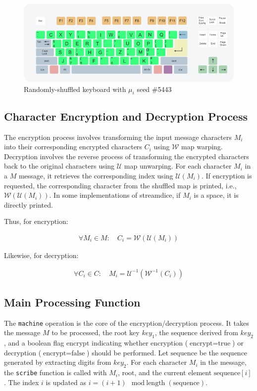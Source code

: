 \documentclass{article}
\begin{document}
\begin{figure}[h]
  \centering
  \includegraphics[width=0.7\linewidth]{img/qwerty_shuffled.png}
  \caption{Randomly-shuffled keyboard with $\mu_i$ seed \#5443}
  \label{fig:hash}
\end{figure}



\subsection{Character Encryption and Decryption Process}

The encryption process involves transforming the input message characters $M_i$ into their corresponding 
encrypted characters $C_i$ using \( \mathcal{W} \) map warping. 
Decryption involves the reverse process of transforming the encrypted characters back to the original characters using \( \mathcal{U} \) map unwarping. 
For each character \( M_i \) in a $M$ message, it retrieves the corresponding index using \( \mathcal{U}(M_i) \). 
If encryption is requested, the corresponding character from the shuffled map is printed,
i.e., \( \mathcal{W}(\mathcal{U}(M_i)) \). In some implementations of streamdice, if \( M_i \) is a space, it is directly printed. 

Thus, for encryption:

\begin{align}
  \forall M_i \in M: \quad C_i = \mathcal{W}(\mathcal{U}(M_i))
\end{align}

Likewise, for decryption:

\begin{align}
  \forall C_i \in C: \quad M_i = \mathcal{U}^{-1}(\mathcal{W}^{-1}(C_i))
\end{align}




\subsection{Main Processing Function}
The \texttt{machine} operation is the core of the encryption/decryption process.
It takes the message \( M \) to be processed, the root key \( key_1 \), the sequence derived from \( key_2 \), 
and a boolean flag \( \text{encrypt} \) indicating whether encryption (\( \text{encrypt} = \text{true} \)) 
or decryption (\( \text{encrypt} = \text{false} \)) should be performed. Let \( \text{sequence} \) be the sequence generated by extracting 
digits from \( key_2 \). For each character \( M_i \) in the message, the \texttt{scribe} function is called
with \( M_i \), \( \text{root} \), and the current element \( \text{sequence}[i] \). The index \( i \) is updated 
as \( i = (i + 1) \mod \text{length}(\text{sequence}) \).
\end{document}
